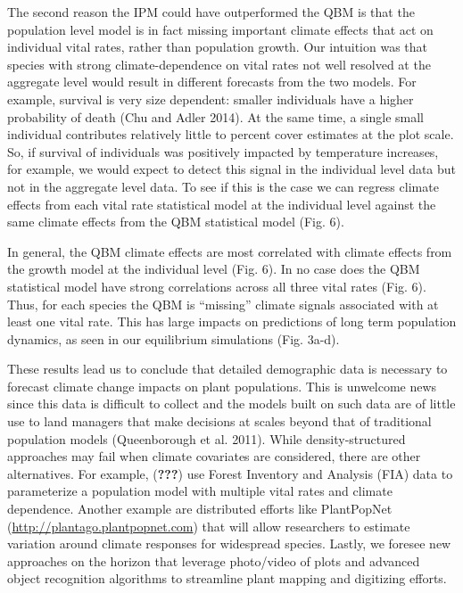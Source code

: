 \documentclass[12pt,]{article}
\begin{document}
The second reason the IPM could have outperformed the QBM is that the
population level model is in fact missing important climate effects that
act on individual vital rates, rather than population growth. Our
intuition was that species with strong climate-dependence on vital rates
not well resolved at the aggregate level would result in different
forecasts from the two models. For example, survival is very size
dependent: smaller individuals have a higher probability of death (Chu
and Adler 2014). At the same time, a single small individual contributes
relatively little to percent cover estimates at the plot scale. So, if
survival of individuals was positively impacted by temperature
increases, for example, we would expect to detect this signal in the
individual level data but not in the aggregate level data. To see if
this is the case we can regress climate effects from each vital rate
statistical model at the individual level against the same climate
effects from the QBM statistical model (Fig. 6).

In general, the QBM climate effects are most correlated with climate
effects from the growth model at the individual level (Fig. 6). In no
case does the QBM statistical model have strong correlations across all
three vital rates (Fig. 6). Thus, for each species the QBM is
``missing'' climate signals associated with at least one vital rate.
This has large impacts on predictions of long term population dynamics,
as seen in our equilibrium simulations (Fig. 3a-d).

These results lead us to conclude that detailed demographic data is
necessary to forecast climate change impacts on plant populations. This
is unwelcome news since this data is difficult to collect and the models
built on such data are of little use to land managers that make
decisions at scales beyond that of traditional population models
(Queenborough et al. 2011). While density-structured approaches may fail
when climate covariates are considered, there are other alternatives.
For example, ({\textbf{???}}) use Forest Inventory and Analysis (FIA)
data to parameterize a population model with multiple vital rates and
climate dependence. Another example are distributed efforts like
PlantPopNet (\url{http://plantago.plantpopnet.com}) that will allow
researchers to estimate variation around climate responses for
widespread species. Lastly, we foresee new approaches on the horizon
that leverage photo/video of plots and advanced object recognition
algorithms to streamline plant mapping and digitizing efforts.
\end{document}
